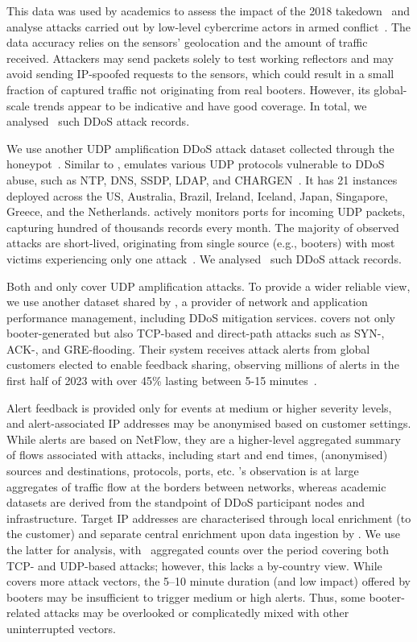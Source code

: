 \documentclass[letterpaper,twocolumn,10pt]{article}
\begin{document}
This data was used by academics to assess the impact of the 2018 takedown~\cite{collier2019booting} and analyse attacks carried out by low-level cybercrime actors in armed conflict~\cite{vu2024getting}. The data accuracy relies on the sensors' geolocation and the amount of traffic received. Attackers may send packets solely to test working reflectors and may avoid sending IP-spoofed requests to the sensors, which could result in a small fraction of captured traffic not originating from real booters. However, its global-scale trends appear to be indicative and have good coverage. In total, we analysed \BTnHopscotchRecords~such DDoS attack records.

 We use another UDP amplification DDoS attack dataset collected through the \amppot honeypot~\cite{kramer2015amppot}. Similar to \hopscotch, \amppot emulates various UDP protocols vulnerable to DDoS abuse, such as NTP, DNS, SSDP, LDAP, and CHARGEN~\cite{rossow2014amplification}. It has 21 instances deployed across the US, Australia, Brazil, Ireland, Iceland, Japan, Singapore, Greece, and the Netherlands. \amppot actively monitors ports for incoming UDP packets, capturing hundred of thousands records every month. The majority of observed attacks are short-lived, originating from single source (e.g., booters) with most victims experiencing only one attack~\cite{kramer2015amppot}. We analysed \BTnAmpPotRecords~such DDoS attack records.

 Both \hopscotch and \amppot only cover UDP amplification attacks. To provide a wider reliable view, we use another dataset shared by \netscout, a provider of network and application performance management, including DDoS mitigation services. \netscout covers not only booter-generated but also TCP-based and direct-path attacks such as SYN-, ACK-, and GRE-flooding. Their system receives attack alerts from global customers elected to enable feedback sharing, observing millions of alerts in the first half of 2023 with over 45\% lasting between 5-15 minutes~\cite{netscoutstats}. 

Alert feedback is provided only for events at medium or higher severity levels, and alert-associated IP addresses may be anonymised based on customer settings. While alerts are based on NetFlow, they are a higher-level aggregated summary of flows associated with attacks, including start and end times, (anonymised) sources and destinations, protocols, ports, etc. \netscout's observation is at large aggregates of traffic flow at the borders between networks, whereas academic datasets are derived from the standpoint of DDoS participant nodes and infrastructure. Target IP addresses are characterised through local enrichment (to the customer) and separate central enrichment upon data ingestion by \netscout. We use the latter for analysis, with \BTnUDPandTCPNetscoutRecords~aggregated counts over the period covering both TCP- and UDP-based attacks; however, this lacks a by-country view. While \netscout covers more attack vectors, the 5--10 minute duration (and low impact) offered by booters may be insufficient to trigger medium or high alerts. Thus, some booter-related attacks may be overlooked or complicatedly mixed with other uninterrupted vectors.
\end{document}
